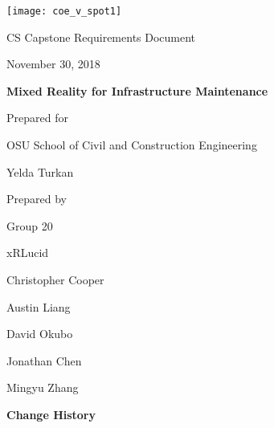 \documentclass[onecolumn, draftclsnofoot,10pt, compsoc]{IEEEtran}
\def \CapstoneTeamName{		xRLucid}
\def \CapstoneTeamNumber{		20}
\def \GroupMemberOne{			Christopher Cooper}
\def \GroupMemberTwo{			Austin Liang}
\def \GroupMemberThree{			David Okubo}
\def \GroupMemberFour{			Jonathan Chen}
\def \GroupMemberFive{			Mingyu Zhang}
\def \CapstoneProjectName{		Mixed Reality for Infrastructure Maintenance}
\def \CapstoneSponsorCompany{	OSU School of Civil and Construction Engineering}
\def \CapstoneSponsorPerson{		Yelda Turkan}
\def \DocType{	%
				Requirements Document
				}
\newcommand{\NameSigPair}[1]{\par
\makebox[2.75in][r]{#1} \hfil 	\makebox[3.25in]{\makebox[2.25in]{\hrulefill} \hfill		\makebox[.75in]{\hrulefill}}
\par\vspace{-12pt} \textit{\tiny\noindent
\makebox[2.75in]{} \hfil		\makebox[3.25in]{\makebox[2.25in][r]{Signature} \hfill	\makebox[.75in][r]{Date}}}}
\renewcommand{\NameSigPair}[1]{#1}
\begin{document}
\begin{titlepage}
    \begin{singlespace}
    	\texttt{[image: coe\_v\_spot1]}
        \hfill
        \par\vspace{.2in}
        \centering
        \scshape{
            \huge CS Capstone \DocType \par
            {\large November 30, 2018}\par
            \vspace{.5in}
            \textbf{\Huge\CapstoneProjectName}\par
            \vfill
            {\large Prepared for}\par
            \Huge \CapstoneSponsorCompany\par
            \vspace{5pt}
            {\Large\NameSigPair{\CapstoneSponsorPerson}\par}
            {\large Prepared by }\par
            Group\CapstoneTeamNumber\par
            \CapstoneTeamName\par
            \vspace{5pt}
            {\Large
                \NameSigPair{\GroupMemberOne}\par
                \NameSigPair{\GroupMemberTwo}\par
                \NameSigPair{\GroupMemberThree}\par
                \NameSigPair{\GroupMemberFour}\par
                \NameSigPair{\GroupMemberFive}\par
            }
            \vspace{20pt}
        }

\end{singlespace}
\end{titlepage}
\newpage
{}
\tableofcontents
\listoffigures
\clearpage

\textbf{Change History}\par
\end{document}
